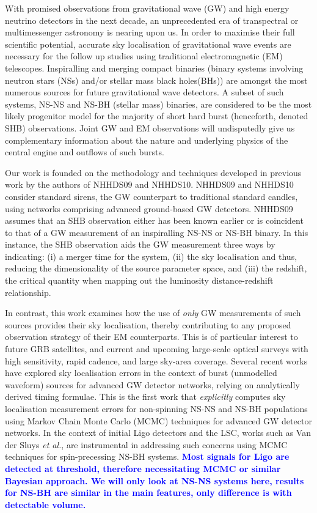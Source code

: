 \documentclass{emulateapj}
\newcommand{\samaya}[1]{\textcolor{blue}{\bf #1}}
\begin{document}
With promised observations from gravitational wave (GW) and high
energy neutrino detectors in the next decade, an unprecedented era of transpectral or multimessenger
astronomy is nearing upon us. In order to
maximise their full scientific potential, accurate sky
localisation of gravitational wave events are necessary for the
follow up studies using
traditional electromagnetic (EM) telescopes. Inspiralling and merging
compact binaries (binary systems involving neutron stars (NSs) and/or
stellar mass black holes(BHs)) are
amongst the most numerous sources for future gravitational wave
detectors. A subset of such systems, NS-NS and NS-BH (stellar mass) binaries, are considered to be the most likely progenitor model for
the majority of short hard burst (henceforth, denoted SHB) observations. Joint GW and EM
observations will undisputedly give us complementary information about
the nature and underlying physics of the central engine and outflows of such bursts.

Our work is founded on the methodology and techniques developed in previous work
by the authors of NHHDS09 and NHHDS10.  NHHDS09 and NHHDS10 consider standard sirens, the GW counterpart to traditional
standard candles, using networks comprising advanced ground-based GW
detectors. NHHDS09 assumes that an SHB observation either has been known
earlier or is coincident to that of a GW measurement of an inspiralling
NS-NS or NS-BH binary. In this instance, the SHB observation aids the GW
measurement three ways by indicating: (i) a merger time for the
system, (ii) the sky localisation and thus, reducing the
dimensionality of the source parameter space, and (iii) the
redshift, the critical quantity when mapping out the luminosity distance-redshift relationship.

In contrast, this work examines how the use of {\sl only} GW
measurements of such sources provides their sky localisation, thereby contributing to
any proposed observation strategy of their EM counterparts. This is of
particular interest to future GRB satellites, and current and upcoming large-scale optical surveys with high sensitivity,
rapid cadence, and large sky-area coverage. Several recent works have
explored sky localisation errors in the context of burst (unmodelled waveform) sources
for advanced GW detector networks, relying on analytically derived
timing formulae. This is the first work that {\sl explicitly} computes
sky localisation measurement errors for non-spinning NS-NS and NS-BH populations using Markov Chain Monte Carlo
(MCMC) techniques for advanced GW detector networks. In the context of
initial Ligo detectors and the LSC, works such as Van der Sluys {\sl
  et al.}, are instrumental in addressing such concerns using MCMC
techniques for spin-precessing NS-BH systems. \samaya{Most signals for
  Ligo are detected at threshold, therefore necessitating MCMC or
  similar Bayesian approach. We will only look at NS-NS systems here,
  results for NS-BH are similar in the main features, only difference
  is with detectable volume.}
\end{document}
